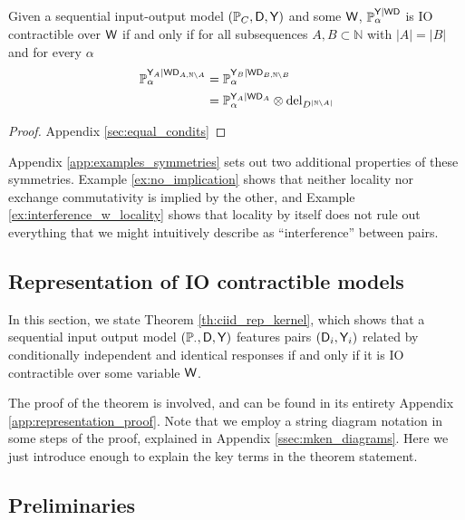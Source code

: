 \begin{theorem}\label{th:equal_of_condits}
Given a sequential input-output model $(\mathbb{P}_C,\mathsf{D},\mathsf{Y})$ and some $\mathsf{W}$, $\mathbb{P}_\alpha^{\mathsf{Y}|\mathsf{WD}}$ is IO contractible over $\mathsf{W}$ if and only if for all subsequences $A,B\subset \mathbb{N}$ with $|A|=|B|$ and for every $\alpha$
\begin{align}
    \mathbb{P}_\alpha^{\mathsf{Y}_A|\mathsf{WD}_{A,\mathbb{N}\setminus A}} &= \mathbb{P}_\alpha^{\mathsf{Y}_B|\mathsf{WD}_{B,\mathbb{N}\setminus B}}\\
    &= \mathbb{P}_\alpha^{\mathsf{Y}_A|\mathsf{WD}_A}\otimes \text{del}_{D^{|\mathbb{N}\setminus A|}}
\end{align}
\end{theorem}

\begin{proof}
Appendix \ref{sec:equal_condits}
\end{proof}

Appendix \ref{app:examples_symmetries} sets out two additional properties of these symmetries. Example \ref{ex:no_implication} shows that neither locality nor exchange commutativity is implied by the other, and Example \ref{ex:interference_w_locality} shows that locality by itself does not rule out everything that we might intuitively describe as ``interference'' between pairs.

\subsection[Representation]{Representation of IO contractible models}\label{sec:rep_theorem}

In this section, we state Theorem \ref{th:ciid_rep_kernel}, which shows that a sequential input output model $(\mathbb{P}_\cdot,\mathsf{D},\mathsf{Y})$ features pairs $(\mathsf{D}_i,\mathsf{Y}_i)$ related by conditionally independent and identical responses if and only if it is IO contractible over some variable $\mathsf{W}$.

The proof of the theorem is involved, and can be found in its entirety Appendix \ref{app:representation_proof}. Note that we employ a string diagram notation in some steps of the proof, explained in Appendix \ref{ssec:mken_diagrams}. Here we just introduce enough to explain the key terms in the theorem statement. 

\subsection{Preliminaries}\label{sec:rep_theorem_background}

